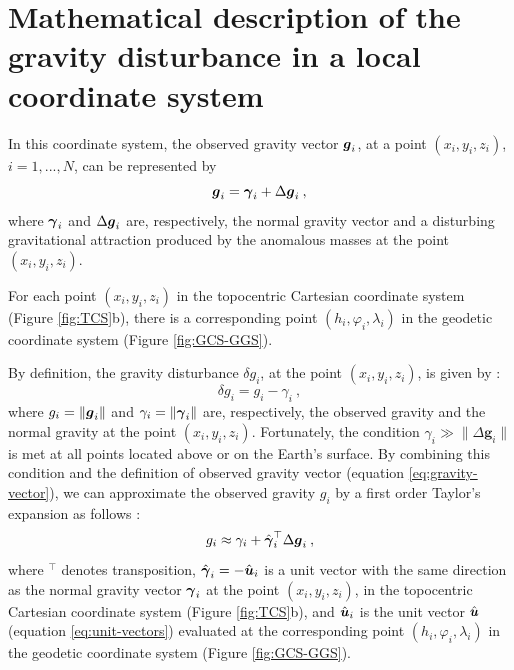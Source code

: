 \documentclass[extra]{gji}
\begin{document}
\section{Mathematical description of the gravity disturbance in a local coordinate system}


In this coordinate system, the observed gravity vector
$\mitbf{g}_{i}$, at a point $(x_{i}, y_{i}, z_{i})$, 
$i = 1, ..., N$, can be represented by
\begin{equation}
\mitbf{g}_{i} = \mitbf{\gamma}_{i} + \Delta \mitbf{g}_{i} \: ,
\label{eq:gravity-vector}
\end{equation}
where $\mitbf{\gamma}_{i}$ and $\Delta \mitbf{g}_{i}$
are, respectively, the normal gravity vector and a
disturbing gravitational attraction produced by the anomalous 
masses at the point $(x_{i}, y_{i}, z_{i})$.

For each point $(x_{i}, y_{i}, z_{i})$ in the topocentric
Cartesian coordinate system (Figure \ref{fig:TCS}b), there is
a corresponding point $(h_{i}, \varphi_{i}, \lambda_{i})$
in the geodetic coordinate system (Figure \ref{fig:GCS-GGS}).


By definition, the gravity disturbance $\delta g_{i}$,
at the point $(x_{i}, y_{i}, z_{i})$, is given by 
\citep{heiskanen-moritz1967, hofmann-wellenhof-moritz2005}:
\begin{equation}
\delta g_{i} =  g_{i} - \gamma_{i} \: ,
\label{eq:gravity-disturbance}
\end{equation}
where $g_{i} = \| \mitbf{g}_{i} \|$ and 
$\gamma_{i} = \| \mitbf{\gamma}_{i} \|$ are,
respectively, the observed gravity and the normal gravity at the
point $(x_{i}, y_{i}, z_{i})$.
Fortunately, the condition 
$\gamma_{i} \gg \| \Delta \mathbf{g}_{i} \|$ 
is met at all points located above or on the Earth's surface.
By combining this condition and the definition of observed gravity vector
(equation \ref{eq:gravity-vector}), we can approximate the observed gravity
$g_{i}$ by a first order Taylor's expansion as follows 
\citep{sanso_sideris2013}:
\begin{equation}
g_{i} \approx \gamma_{i} + 
\hat{\mitbf{\gamma}}_{i}^{\top} \Delta \mitbf{g}_{i} \: ,
\label{eq:gobs-approx}
\end{equation}
where $^{\top}$ denotes transposition,
$\hat{\mitbf{\gamma}}_{i} = -\hat{\mitbf{u}}_{i}$ is a unit 
vector with the same direction as the normal gravity vector 
$\mitbf{\gamma}_{i}$ at the point $(x_{i}, y_{i}, z_{i})$, in the
topocentric Cartesian coordinate system (Figure \ref{fig:TCS}b), and
$\hat{\mitbf{u}}_{i}$ is the unit vector $\hat{\mitbf{u}}$ 
(equation \ref{eq:unit-vectors}) evaluated at the corresponding 
point $(h_{i}, \varphi_{i}, \lambda_{i})$ in the 
geodetic coordinate system (Figure \ref{fig:GCS-GGS}).
\end{document}

